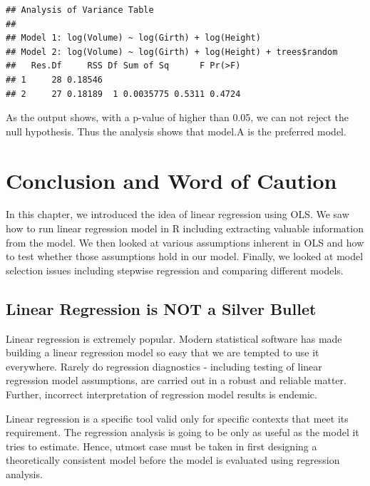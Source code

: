 \documentclass[10pt, letterpaper, twoside]{memoir}\usepackage{knitr}
\begin{document}
\begin{knitrout}
\color{fgcolor}\begin{kframe}
\begin{alltt}
\end{alltt}
\begin{verbatim}
## Analysis of Variance Table
## 
## Model 1: log(Volume) ~ log(Girth) + log(Height)
## Model 2: log(Volume) ~ log(Girth) + log(Height) + trees$random
##   Res.Df     RSS Df Sum of Sq      F Pr(>F)
## 1     28 0.18546                           
## 2     27 0.18189  1 0.0035775 0.5311 0.4724
\end{verbatim}
\end{kframe}
\end{knitrout}

As the output shows, with a p-value of higher than 0.05, we can not reject the null hypothesis. Thus the analysis shows that model.A is the preferred model.


\section{Conclusion and Word of Caution}

In this chapter, we introduced the idea of linear regression using OLS. We saw how to run linear regression model in R including extracting valuable information from the model. We then looked at various assumptions inherent in  OLS and how to test whether those assumptions hold in our model. Finally, we looked at model selection issues including stepwise regression and comparing different models.

\subsection{Linear Regression is NOT a Silver Bullet}

Linear regression is extremely popular. Modern statistical software has made building a linear regression model so easy that we are tempted to use it everywhere. Rarely do regression diagnostics - including testing of linear regression model assumptions, are carried out in a robust and reliable matter. Further, incorrect interpretation of regression model results is endemic. 

Linear regression is a specific tool valid only for specific contexts that meet its requirement. The regression analysis is going to be only as useful as the model it tries to estimate. Hence, utmost case must be taken in first designing a theoretically consistent model before the model is evaluated using regression analysis.
\end{document}
